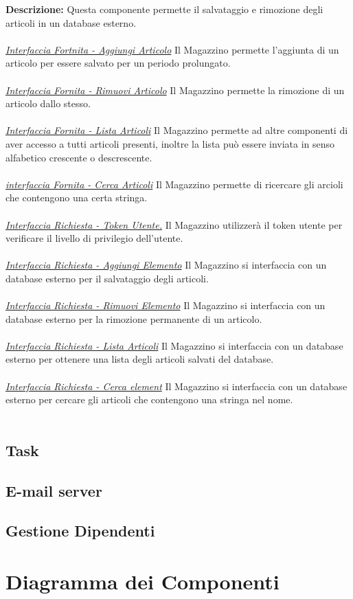 \documentclass{report}
\begin{document}
\textbf{Descrizione: } Questa componente permette il salvataggio e rimozione degli articoli in un database esterno.\\ \\
\uline{\textit{Interfaccia Fortnita - Aggiungi Articolo}}
Il Magazzino permette l'aggiunta di un articolo per essere salvato per un periodo prolungato.\\ \\
\uline{\textit{Interfaccia Fornita - Rimuovi Articolo}}
Il Magazzino permette la rimozione di un articolo dallo stesso.\\ \\
\uline{\textit{Interfaccia Fornita - Lista Articoli}}
Il Magazzino permette ad altre componenti di aver accesso a tutti articoli presenti, inoltre la lista può essere inviata in senso alfabetico crescente o descrescente.\\ \\
\uline{\textit{interfaccia Fornita - Cerca Articoli}}
Il Magazzino permette di ricercare gli arcioli che contengono una certa stringa.\\ \\
\uline{\textit{Interfaccia Richiesta - Token Utente.}} Il Magazzino utilizzerà il token utente per verificare il livello di privilegio dell'utente.\\ \\
\uline{\textit{Interfaccia Richiesta - Aggiungi Elemento}}
Il Magazzino si interfaccia con un database esterno per il salvataggio degli articoli.\\ \\
\uline{\textit{Interfaccia Richiesta - Rimuovi Elemento}}
Il Magazzino si interfaccia con un database esterno per la rimozione permanente di un articolo.\\ \\
\uline{\textit{Interfaccia Richiesta - Lista Articoli}}
Il Magazzino si interfaccia con un database esterno per ottenere una lista degli articoli salvati del database.\\ \\
\uline{\textit{Interfaccia Richiesta - Cerca element}}
Il Magazzino si interfaccia con un database esterno per cercare gli articoli che contengono una stringa nel nome.\\ \\
\subsection*{Task}

\subsection*{E-mail server}

\subsection*{Gestione Dipendenti}



\section{Diagramma dei Componenti}
\end{document}
